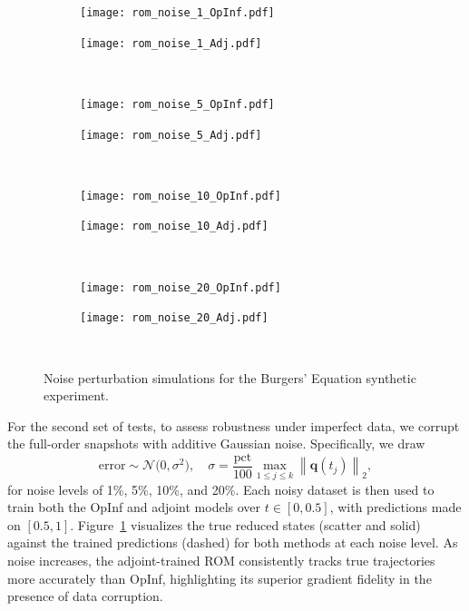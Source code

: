 \begin{figure}[h!]
  \centering
  \begin{subfigure}[c]{0.49\textwidth}
      \centering
      \texttt{[image: rom\_noise\_1\_OpInf.pdf]}
  \end{subfigure}
  \begin{subfigure}[c]{0.49\textwidth}
      \centering
      \texttt{[image: rom\_noise\_1\_Adj.pdf]}
  \end{subfigure} \\[1ex]
    
  \begin{subfigure}[c]{0.49\textwidth}
      \centering
      \texttt{[image: rom\_noise\_5\_OpInf.pdf]}
  \end{subfigure} 
  \begin{subfigure}[c]{0.49\textwidth}
      \centering
      \texttt{[image: rom\_noise\_5\_Adj.pdf]}
  \end{subfigure} \\[1ex]
    
  \begin{subfigure}[c]{0.49\textwidth}
      \centering
      \texttt{[image: rom\_noise\_10\_OpInf.pdf]}
  \end{subfigure} 
  \begin{subfigure}[c]{0.49\textwidth}
      \centering
      \texttt{[image: rom\_noise\_10\_Adj.pdf]}
  \end{subfigure} \\[1ex]
    
  \begin{subfigure}[c]{0.49\textwidth}
      \centering
      \texttt{[image: rom\_noise\_20\_OpInf.pdf]}
  \end{subfigure} 
  \begin{subfigure}[c]{0.49\textwidth}
      \centering
      \texttt{[image: rom\_noise\_20\_Adj.pdf]}
  \end{subfigure} \\[1ex]
  \caption{Noise perturbation simulations for the Burgers' Equation synthetic experiment.}
  \label{fig:five_by_two3}
\end{figure}

\newpage

For the second set of tests, to assess robustness under imperfect data, we corrupt the full-order snapshots with additive Gaussian noise.  Specifically, we draw\\
$$\mathrm{error} \sim \mathcal{N}\bigl(0,\sigma^2\bigr),
\quad \sigma=\dfrac{\text{pct}}{100}\max_{1 \leq j \leq k} \left\| \mathbf{q}(t_j) \right\|_2,$$ 
for noise levels of 1\%, 5\%, 10\%, and 20\%.  Each noisy dataset is then used to train both the OpInf and adjoint models over $t\in[0,0.5]$, with predictions made on $[0.5,1]$. Figure~\ref{fig:five_by_two3} visualizes the true reduced states (scatter and solid) against the trained predictions (dashed) for both methods at each noise level. As noise increases, the adjoint-trained ROM consistently tracks true trajectories more accurately than OpInf, highlighting its superior gradient fidelity in the presence of data corruption.

